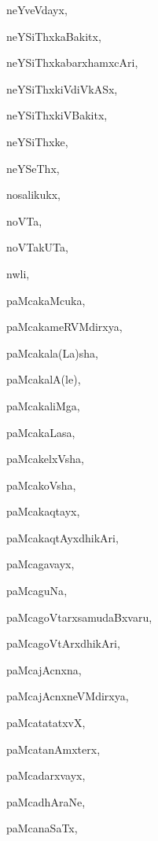 \begin{multicols}{2}
{neYveVdayx}, \pageref{neYveVdayx}

{neYSiThxkaBakitx}, \pageref{neYSiThxkaBakitx}

{neYSiThxkabarxhamxcAri}, \pageref{neYSiThxkabarxhamxcAri}

{neYSiThxkiVdiVkASx}, \pageref{neYSiThxkiVdiVkASx}

{neYSiThxkiVBakitx}, \pageref{neYSiThxkiVBakitx}

{neYSiThxke}, \pageref{neYSiThxke}

{neYSeThx}, \pageref{neYSeThx}

{nosalikukx}, \pageref{nosalikukx}

{noVTa}, \pageref{noVTa}

{noVTakUTa}, \pageref{noVTakUTa}

{nwli}, \pageref{nwli}

{paMcakaMcuka}, \pageref{paMcakaMcuka}

{paMcakameRVMdirxya}, \pageref{paMcakameRVMdirxya}

{paMcakala(La)sha}, \pageref{paMcakalaLasha}

{paMcakalA(le)}, \pageref{paMcakalAle}

{paMcakaliMga}, \pageref{paMcakaliMga}

{paMcakaLasa}, \pageref{paMcakaLasa}

{paMcakelxVsha}, \pageref{paMcakelxVsha}

{paMcakoVsha}, \pageref{paMcakoVsha}

{paMcakaqtayx}, \pageref{paMcakaqtayx}

{paMcakaqtAyxdhikAri}, \pageref{paMcakaqtAyxdhikAri}

{paMcagavayx}, \pageref{paMcagavayx}

{paMcaguNa}, \pageref{paMcaguNa}

{paMcagoVtarxsamudaBxvaru}, \pageref{paMcagoVtarxsamudaBxvaru}

{paMcagoVtArxdhikAri}, \pageref{paMcagoVtArxdhikAri}

{paMcajAcnxna}, \pageref{paMcajAcnxna}

{paMcajAcnxneVMdirxya}, \pageref{paMcajAcnxneVMdirxya}

{paMcatatatxvX}, \pageref{paMcatatatxvX}

{paMcatanAmxterx}, \pageref{paMcatanAmxterx}

{paMcadarxvayx}, \pageref{paMcadarxvayx}

{paMcadhAraNe}, \pageref{paMcadhAraNe}

{paMcanaSaTx}, \pageref{paMcanaSaTx}


\end{multicols}
